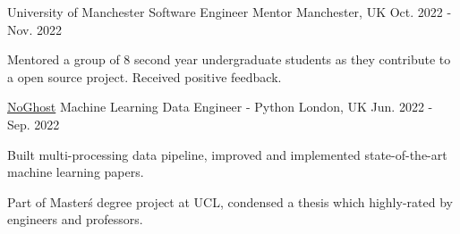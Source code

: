 



\begin{cventries}

    \cventry
        {University of Manchester} %
        {Software Engineer Mentor} %
        {Manchester, UK} %
        {Oct. 2022 - Nov. 2022} %
        {
        \begin{cvitems} %
            \item {Mentored a group of 8 second year undergraduate students as they contribute to a open source project. Received positive feedback.}
        \end{cvitems}
        }

    \cventry
        {\href{https://www.noghost.co.uk/}{NoGhost}} %
        {Machine Learning Data Engineer - Python} %
        {London, UK} %
        {Jun. 2022 - Sep. 2022} %
        {
        \begin{cvitems} %
            \item {Built multi-processing data pipeline, improved and implemented state-of-the-art machine learning papers.}
            \item {Part of Master\'s degree project at UCL, condensed a thesis which highly-rated by engineers and professors.}
        \end{cvitems}
        }


\end{cventries}